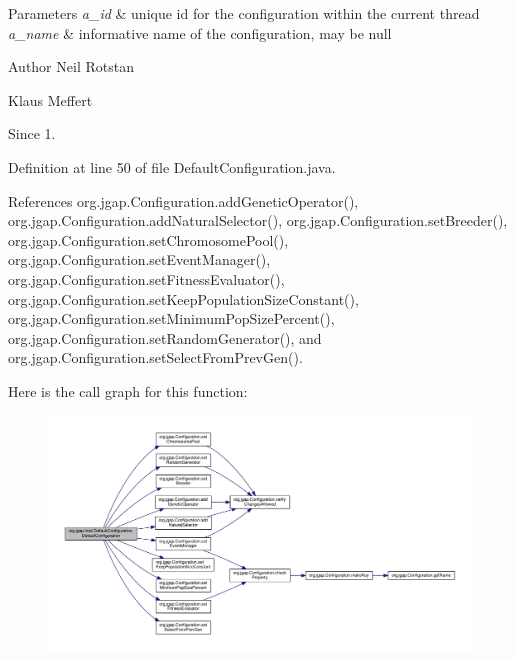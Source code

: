 \begin{DoxyParams}{Parameters}
{\em a\-\_\-id} & unique id for the configuration within the current thread \\
\hline
{\em a\-\_\-name} & informative name of the configuration, may be null\\
\hline
\end{DoxyParams}
\begin{DoxyAuthor}{Author}
Neil Rotstan 

Klaus Meffert 
\end{DoxyAuthor}
\begin{DoxySince}{Since}
1. 
\end{DoxySince}


Definition at line 50 of file Default\-Configuration.\-java.



References org.\-jgap.\-Configuration.\-add\-Genetic\-Operator(), org.\-jgap.\-Configuration.\-add\-Natural\-Selector(), org.\-jgap.\-Configuration.\-set\-Breeder(), org.\-jgap.\-Configuration.\-set\-Chromosome\-Pool(), org.\-jgap.\-Configuration.\-set\-Event\-Manager(), org.\-jgap.\-Configuration.\-set\-Fitness\-Evaluator(), org.\-jgap.\-Configuration.\-set\-Keep\-Population\-Size\-Constant(), org.\-jgap.\-Configuration.\-set\-Minimum\-Pop\-Size\-Percent(), org.\-jgap.\-Configuration.\-set\-Random\-Generator(), and org.\-jgap.\-Configuration.\-set\-Select\-From\-Prev\-Gen().



Here is the call graph for this function\-:
\nopagebreak
\begin{figure}[H]
\begin{center}
\leavevmode
\includegraphics[width=350pt]{classorg_1_1jgap_1_1impl_1_1_default_configuration_a94e1a46c78854ca700769acc748f6e65_cgraph}
\end{center}
\end{figure}





